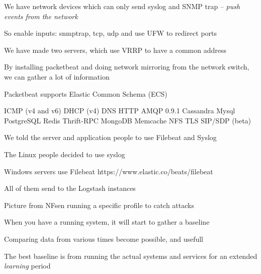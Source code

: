 \documentclass[Screen16to9,17pt]{foils}
\begin{document}


\begin{list2}
\item We have network devices which can only send syslog and SNMP trap -- \emph{push events from the network}
\item So enable inputs: snmptrap, tcp, udp and use UFW to redirect ports
\item We have made two servers, which use VRRP to have a common address
\end{list2}




\begin{list2}
\item By installing packetbeat and doing network mirroring from the network switch, we can gather a lot of information
\item Packetbeat supports Elastic Common Schema (ECS) 
\item ICMP (v4 and v6)
DHCP (v4)
DNS
HTTP
AMQP 0.9.1
Cassandra
Mysql
PostgreSQL
Redis
Thrift-RPC
MongoDB
Memcache
NFS
TLS
SIP/SDP (beta)
\end{list2}




\begin{quote}

\end{quote}

\begin{list2}
\item We told the server and application people to use Filebeat and Syslog
\item The Linux people decided to use syslog
\item Windows servers use Filebeat \link{}https://www.elastic.co/beats/filebeat
\item All of them send to the Logstash instances
\end{list2}



\begin{list2}
\item Picture from NFsen running a specific profile to catch attacks
\item When you have a running system, it will start to gather a baseline
\item Comparing data from various times become possible, and usefull
\item The best baseline is from running the actual systems and services for an extended \emph{learning} period
\end{list2}
\end{document}
